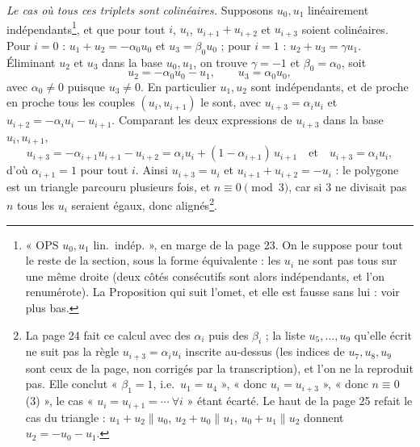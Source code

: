 \documentclass[11pt,a4paper]{article}
\begin{document}
\emph{Le cas où tous ces triplets sont colinéaires.} Supposons $u_0, u_1$
linéairement indépendants\footnote{« OPS $u_0, u_1$ lin.\ indép. », en marge de
la page 23. On le suppose pour tout le reste de la section, sous la forme
équivalente : les $u_i$ ne sont pas tous sur une même droite (deux côtés
consécutifs sont alors indépendants, et l'on renumérote). La Proposition qui
suit l'omet, et elle est fausse sans lui : voir plus bas.}, et que pour tout
$i$, $u_i$, $u_{i+1} + u_{i+2}$ et $u_{i+3}$ soient colinéaires. Pour $i = 0$ :
$u_1 + u_2 = -\alpha_0 u_0$ et $u_3 = \beta_0 u_0$ ; pour $i = 1$ :
$u_2 + u_3 = \gamma u_1$. Éliminant $u_2$ et $u_3$ dans la base $u_0, u_1$, on
trouve $\gamma = -1$ et $\beta_0 = \alpha_0$, soit
\[
  u_2 = -\alpha_0 u_0 - u_1, \qquad u_3 = \alpha_0 u_0 ,
\]
avec $\alpha_0 \neq 0$ puisque $u_3 \neq 0$. En particulier $u_1, u_2$ sont
indépendants, et de proche en proche tous les couples $(u_i, u_{i+1})$ le sont,
avec $u_{i+3} = \alpha_i u_i$ et $u_{i+2} = -\alpha_i u_i - u_{i+1}$.
Comparant les deux expressions de $u_{i+3}$ dans la base $u_i, u_{i+1}$,
\[
  u_{i+3} = -\alpha_{i+1} u_{i+1} - u_{i+2}
  = \alpha_i u_i + (1 - \alpha_{i+1})\, u_{i+1}
  \quad \text{et} \quad u_{i+3} = \alpha_i u_i ,
\]
d'où $\alpha_{i+1} = 1$ pour tout $i$. Ainsi $u_{i+3} = u_i$ et
$u_{i+1} + u_{i+2} = -u_i$ : le polygone est un triangle parcouru plusieurs
fois, et $n \equiv 0 \pmod 3$, car si $3$ ne divisait pas $n$ tous les $u_i$
seraient égaux, donc alignés\footnote{La page 24 fait ce calcul avec des
$\alpha_i$ puis des $\beta_i$ ; la liste $u_5, \ldots, u_9$ qu'elle écrit ne
suit pas la règle $u_{i+3} = \alpha_i u_i$ inscrite au-dessus (les indices de
$u_7, u_8, u_9$ sont ceux de la page, non corrigés par la transcription), et
l'on ne la reproduit pas. Elle conclut « $\beta_1 = 1$, i.e.\ $u_1 = u_4$ »,
« donc $u_i = u_{i+3}$ », « donc $n \equiv 0$ (3) », le cas
« $u_i = u_{i+1} = \cdots\ \forall i$ » étant écarté. Le haut de la page 25
refait le cas du triangle : $u_1 + u_2 \parallel u_0$, $u_2 + u_0 \parallel u_1$,
$u_0 + u_1 \parallel u_2$ donnent $u_2 = -u_0 - u_1$.}.
\end{document}
